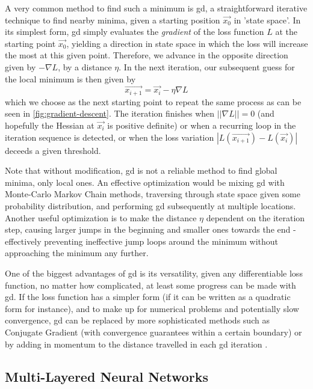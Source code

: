A very common method to find such a minimum is \gls{gd}, a straightforward iterative technique to find nearby minima, given a starting position $\vec{x_0}$ in 'state space'.
In its simplest form, \gls{gd} simply evaluates the \textit{gradient} of the loss function $L$ at the starting point $\vec{x_0}$, yielding a direction in state space in which the loss will increase the most at this given point.
Therefore, we advance in the opposite direction given by $-\nabla L$, by a distance $\eta$.
In the next iteration, our subsequent guess for the local minimum is then given by $$\vec{x_{i+1}} = \vec{x_i} - \eta \nabla L$$
which we choose as the next starting point to repeat the same process as can be seen in \autoref{fig:gradient-descent}.
The iteration finishes when $||\nabla L|| = 0$ (and hopefully the Hessian at $\vec{x_i}$ is positive definite) or when a recurring loop in the iteration sequence is detected, or when the loss variation $|L(\vec{x_{i+1}}) - L(\vec{x_i})|$ deceeds a given threshold.

Note that without modification, \gls{gd} is not a reliable method to find global minima, only local ones.
An effective optimization would be mixing \gls{gd} with Monte-Carlo Markov Chain methods, traversing through state space given some probability distribution, and performing \gls{gd} subsequently at multiple locations.
Another useful optimization is to make the distance $\eta$ dependent on the iteration step, causing larger jumps in the beginning and smaller ones towards the end - effectively preventing ineffective jump loops around the minimum without approaching the minimum any further.

One of the biggest advantages of \glsdesc{gd} is its versatility, given any differentiable loss function, no matter how complicated, at least some progress can be made with \gls{gd}.
If the loss function has a simpler form (if it can be written as a quadratic form for instance), and to make up for numerical problems and potentially slow convergence, \gls{gd} can be replaced by more sophisticated methods such as Conjugate Gradient (with convergence guarantees within a certain boundary) or by adding in momentum to the distance travelled in each \gls{gd} iteration \parencite{bishop-pattern-recognition-and-ml}.

\subsection{Multi-Layered Neural Networks}

